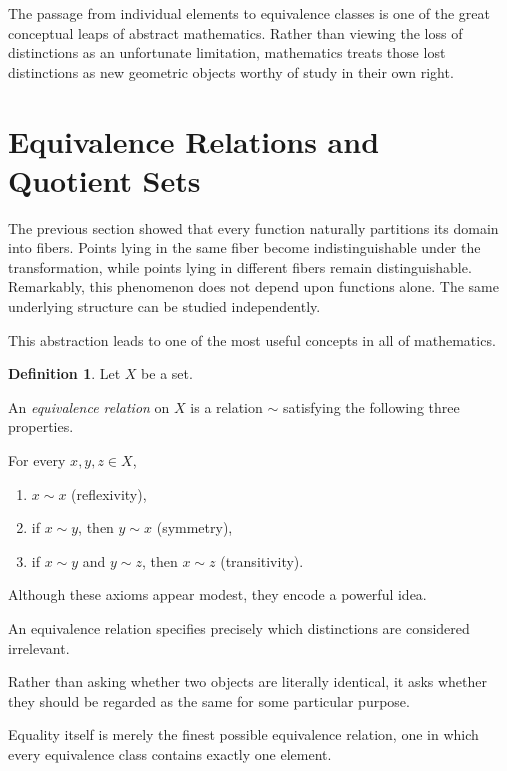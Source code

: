 \documentclass[11pt]{book}
\numberwithin{equation}{chapter}
\theoremstyle{definition}
\newtheorem{definition}{Definition}[chapter]
\theoremstyle{plain}
\theoremstyle{remark}
\begin{document}
The passage from individual elements to equivalence classes is one of the great conceptual leaps of abstract mathematics. Rather than viewing the loss of distinctions as an unfortunate limitation, mathematics treats those lost distinctions as new geometric objects worthy of study in their own right.


\section{Equivalence Relations and Quotient Sets}

The previous section showed that every function naturally partitions its domain into fibers. Points lying in the same fiber become indistinguishable under the transformation, while points lying in different fibers remain distinguishable. Remarkably, this phenomenon does not depend upon functions alone. The same underlying structure can be studied independently.

This abstraction leads to one of the most useful concepts in all of mathematics.

\begin{definition}
Let \(X\) be a set.

An \emph{equivalence relation} on \(X\) is a relation \(\sim\) satisfying the following three properties.

For every \(x,y,z\in X\),

\begin{enumerate}
\item \(x\sim x\) (reflexivity),
\item if \(x\sim y\), then \(y\sim x\) (symmetry),
\item if \(x\sim y\) and \(y\sim z\), then \(x\sim z\) (transitivity).
\end{enumerate}
\end{definition}

Although these axioms appear modest, they encode a powerful idea.

An equivalence relation specifies precisely which distinctions are considered irrelevant.

Rather than asking whether two objects are literally identical, it asks whether they should be regarded as the same for some particular purpose.

Equality itself is merely the finest possible equivalence relation, one in which every equivalence class contains exactly one element.
\end{document}
